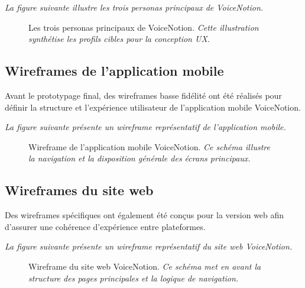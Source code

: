 \noindent
\textit{La figure suivante illustre les trois personas principaux de VoiceNotion.}
\begin{figure}[H]
    \centering
    \caption{Les trois personas principaux de VoiceNotion. \newline\textit{Cette illustration synthétise les profils cibles pour la conception UX.}}
    \label{fig:voicenotion_personas}
\end{figure}


\subsection{Wireframes de l'application mobile}

Avant le prototypage final, des wireframes basse fidélité ont été réalisés pour définir la structure et l'expérience utilisateur de l'application mobile VoiceNotion.

\noindent
\textit{La figure suivante présente un wireframe représentatif de l'application mobile.}
\begin{figure}[H]
    \centering
    \caption{Wireframe de l'application mobile VoiceNotion. \newline\textit{Ce schéma illustre la navigation et la disposition générale des écrans principaux.}}
    \label{fig:wireframe_app}
\end{figure}

\subsection{Wireframes du site web}

Des wireframes spécifiques ont également été conçus pour la version web afin d'assurer une cohérence d'expérience entre plateformes.

\noindent
\textit{La figure suivante présente un wireframe représentatif du site web VoiceNotion.}
\begin{figure}[H]
    \centering
    \caption{Wireframe du site web VoiceNotion. \newline\textit{Ce schéma met en avant la structure des pages principales et la logique de navigation.}}
    \label{fig:wireframe_web}
\end{figure}

